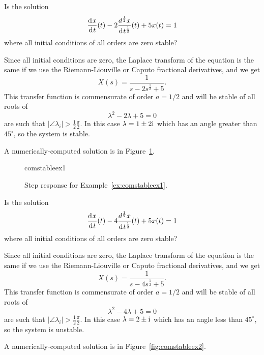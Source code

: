 \begin{example}
  Is the solution
  \begin{equation*}
  	\frac{\operatorname{d}\hspace*{-1pt} x}{\operatorname{d}\hspace*{-1pt} t}(t) -2  \frac{d^\frac{1}{2} x}{\operatorname{d}\hspace*{-1pt} t^\frac{1}{2}}(t) + 5 x(t) = 1
  \end{equation*}
  where all initial conditions of all orders are zero stable?

  Since all initial conditions are zero, the Laplace transform of the equation is the same if we use the Riemann-Liouville or Caputo fractional derivatives, and we get
  \begin{equation*}
    X(s) = \frac{1}{s - 2 s^\frac{1}{2} + 5}.
  \end{equation*}
  This transfer function is commensurate of order $a = 1/2$ and will be stable of all roots of
  \begin{equation*}
    \lambda^2 - 2 \lambda + 5 = 0
  \end{equation*}
   are such that $\left| \angle \lambda_i \right| > \frac{1}{2} \frac{\pi}{2}$.  In this case $\lambda = 1 \pm 2 \mathrm{i}\mkern1mu$ which has an angle greater than $45^\circ$, so the system is stable. 

	A numerically-computed solution is in Figure~\ref{fig:comstableex1}.
	\label{ex:comstableex1}
\end{example}

\begin{figure}
  \centering
  {comstableex1}
  \caption{Step response for Example~\ref{ex:comstableex1}.}
  \label{fig:comstableex1}
\end{figure}

\begin{example}
  Is the solution
  \begin{equation*}
  	\frac{\operatorname{d}\hspace*{-1pt} x}{\operatorname{d}\hspace*{-1pt} t}(t) -4  \frac{d^\frac{1}{2} x}{\operatorname{d}\hspace*{-1pt} t^\frac{1}{2}}(t) + 5 x(t) = 1
  \end{equation*}
  where all initial conditions of all orders are zero stable?

  Since all initial conditions are zero, the Laplace transform of the equation is the same if we use the Riemann-Liouville or Caputo fractional derivatives, and we get
  \begin{equation*}
    X(s) = \frac{1}{s - 4 s^\frac{1}{2} + 5}.
  \end{equation*}
  This transfer function is commensurate of order $a = 1/2$ and will be stable of all roots of
  \begin{equation*}
    \lambda^2 - 4 \lambda + 5 = 0
  \end{equation*}
   are such that $\left| \angle \lambda_i \right| > \frac{1}{2} \frac{\pi}{2}$.  In this case $\lambda = 2 \pm  \mathrm{i}\mkern1mu$ which has an angle less than $45^\circ$, so the system is unstable. 

	A numerically-computed solution is in Figure~\ref{fig:comstableex2}.
	\label{ex:comstableex2}
\end{example}

